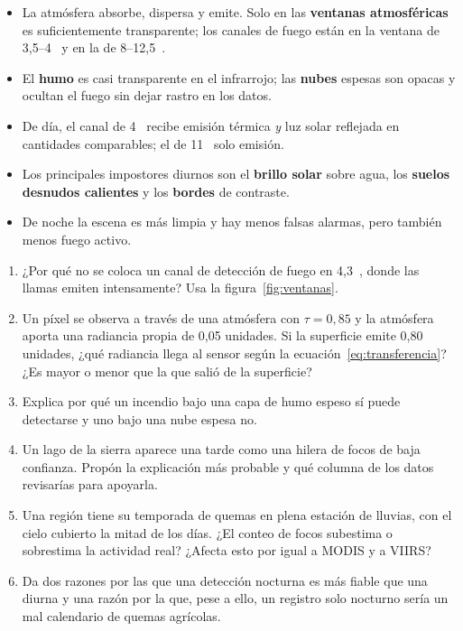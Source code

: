 \resumen

\begin{itemize}
  \item La atmósfera absorbe, dispersa y emite. Solo en las \textbf{ventanas atmosféricas} es
  suficientemente transparente; los canales de fuego están en la ventana de 3,5--4~\um{} y en
  la de 8--12,5~\um.
  \item El \textbf{humo} es casi transparente en el infrarrojo; las \textbf{nubes} espesas son
  opacas y ocultan el fuego sin dejar rastro en los datos.
  \item De día, el canal de 4~\um{} recibe emisión térmica \emph{y} luz solar reflejada en
  cantidades comparables; el de 11~\um{} solo emisión.
  \item Los principales impostores diurnos son el \textbf{brillo solar} sobre agua, los
  \textbf{suelos desnudos calientes} y los \textbf{bordes} de contraste.
  \item De noche la escena es más limpia y hay menos falsas alarmas, pero también menos fuego
  activo.
\end{itemize}

\ejercicios

\begin{enumerate}
  \item ¿Por qué no se coloca un canal de detección de fuego en 4,3~\um, donde las llamas emiten
  intensamente? Usa la figura~\ref{fig:ventanas}.
  \item Un píxel se observa a través de una atmósfera con $\tau = 0{,}85$ y la atmósfera aporta
  una radiancia propia de 0,05 unidades. Si la superficie emite 0,80 unidades, ¿qué radiancia
  llega al sensor según la ecuación~\eqref{eq:transferencia}? ¿Es mayor o menor que la que
  salió de la superficie?
  \item Explica por qué un incendio bajo una capa de humo espeso sí puede detectarse y uno bajo
  una nube espesa no.
  \item Un lago de la sierra aparece una tarde como una hilera de focos de baja confianza.
  Propón la explicación más probable y qué columna de los datos revisarías para apoyarla.
  \item Una región tiene su temporada de quemas en plena estación de lluvias, con el cielo
  cubierto la mitad de los días. ¿El conteo de focos subestima o sobrestima la actividad real?
  ¿Afecta esto por igual a MODIS y a VIIRS?
  \item Da dos razones por las que una detección nocturna es más fiable que una diurna y una
  razón por la que, pese a ello, un registro solo nocturno sería un mal calendario de quemas
  agrícolas.
\end{enumerate}
